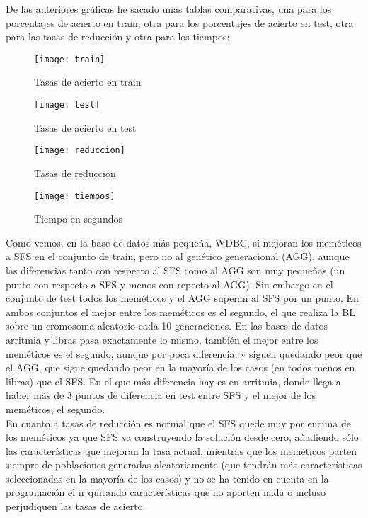 \documentclass[12pt]{article}
\begin{document}
De las anteriores gráficas he sacado unas tablas comparativas, una para los porcentajes de acierto en train, otra para los porcentajes de acierto en test, otra para las tasas de reducción y otra para los tiempos:

\begin{figure}[H]
\centering
\texttt{[image: train]}
\caption{Tasas de acierto en train} \label{fig:train}
\end{figure}

\begin{figure}[H]
\centering
\texttt{[image: test]}
\caption{Tasas de acierto en test} \label{fig:test}
\end{figure}

\begin{figure}[H]
\centering
\texttt{[image: reduccion]}
\caption{Tasas de reduccion} \label{fig:reduccion}
\end{figure}

\begin{figure}[H]
\centering
\texttt{[image: tiempos]}
\caption{Tiempo en segundos} \label{fig:tiempos}
\end{figure}

Como vemos, en la base de datos más pequeña, WDBC, sí mejoran los meméticos a SFS en el conjunto de train, pero no al genético generacional (AGG), aunque las diferencias tanto con respecto al SFS como al AGG son muy pequeñas (un punto con respecto a SFS y menos con repecto al AGG). Sin embargo en el conjunto de test todos los meméticos y el AGG superan al SFS por un punto. En ambos conjuntos el mejor entre los meméticos es el segundo, el que realiza la BL sobre un cromosoma aleatorio cada 10 generaciones. En las bases de datos arritmia y libras pasa exactamente lo mismo, también el mejor entre los meméticos es el segundo, aunque por poca diferencia, y siguen quedando peor que el AGG, que sigue quedando peor en la mayoría de los casos (en todos menos en libras) que el SFS. En el que más diferencia hay es en arritmia, donde llega a haber más de 3 puntos de diferencia en test entre SFS y el mejor de los meméticos, el segundo.\\

En cuanto a tasas de reducción es normal que el SFS quede muy por encima de los meméticos ya que SFS va construyendo la solución desde cero, añadiendo sólo las características que mejoran la tasa actual, mientras que los meméticos parten siempre de poblaciones generadas aleatoriamente (que tendrán más características seleccionadas en la mayoría de los casos) y no se ha tenido en cuenta en la programación el ir quitando características que no aporten nada o incluso perjudiquen las tasas de acierto.\\
\end{document}
